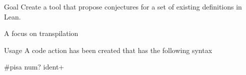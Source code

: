 \begin{frame}{Goal} %
  Create a tool that propose conjectures for a set of existing definitions in Lean.

  \vspace{1cm}

  A focus on transpilation
\end{frame}


\begin{frame}[fragile]{Usage} %
  A code action has been created that has the following syntax
  \vspace{1cm}
  \begin{LeanCode}
    #pisa num? ident+
  \end{LeanCode}
\end{frame}


